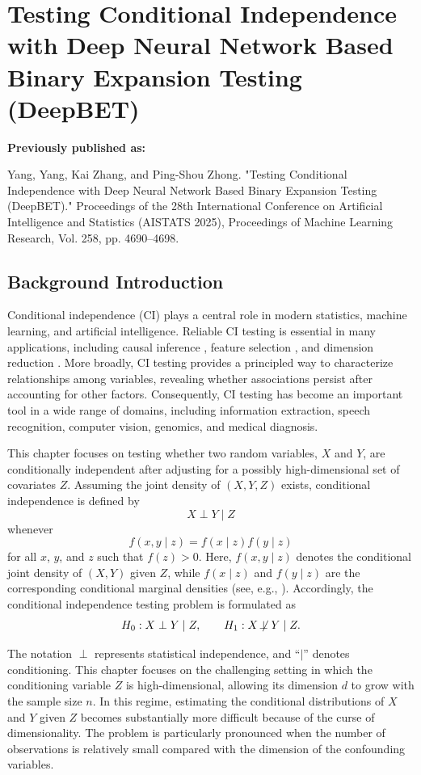 \documentclass[12pt,reqno,oneside]{amsbook}
\theoremstyle{definition}
\theoremstyle{remark}
\begin{document}
\chapter{Testing Conditional Independence with Deep Neural Network Based Binary Expansion Testing (DeepBET)}
\label{DeepBET}
\noindent\textbf{Previously published as:}

Yang, Yang, Kai Zhang, and Ping-Shou Zhong. "Testing Conditional Independence with Deep Neural Network Based Binary Expansion Testing (DeepBET)." Proceedings of the 28th International Conference on Artificial Intelligence and Statistics (AISTATS 2025), Proceedings of Machine Learning Research, Vol. 258, pp. 4690–4698.


\section{Background Introduction}

Conditional independence (CI) plays a central role in modern statistics, machine learning, and artificial intelligence. Reliable CI testing is essential in many applications, including causal inference \cite{Pearl2009CausalII}, feature selection \cite{Cai2018FeatureSM}, and dimension reduction \cite{Waggoner_2021}. More broadly, CI testing provides a principled way to characterize relationships among variables, revealing whether associations persist after accounting for other factors. Consequently, CI testing has become an important tool in a wide range of domains, including information extraction, speech recognition, computer vision, genomics, and medical diagnosis.

\hspace{0.5cm}
This chapter focuses on testing whether two random variables, $X$ and $Y$, are conditionally independent after adjusting for a possibly high-dimensional set of covariates $Z$. Assuming the joint density of $(X,Y,Z)$ exists, conditional independence is defined by
\[
X \perp Y \mid Z
\]
whenever
\[
f(x,y\mid z)=f(x\mid z)f(y\mid z)
\]
for all $x$, $y$, and $z$ such that $f(z)>0$. Here,
$f(x,y\mid z)$ denotes the conditional joint density of $(X,Y)$ given $Z$, while
$f(x\mid z)$ and $f(y\mid z)$ are the corresponding conditional marginal densities (see, e.g., \cite{Shah_2020}). Accordingly, the conditional independence testing problem is formulated as
\[
H_0:X\perp Y\mid Z,
\qquad
H_1:X\not\!\perp Y\mid Z.
\]

The notation $\perp$ represents statistical independence, and ``$|$'' denotes conditioning. This chapter focuses on the challenging setting in which the conditioning variable $Z$ is high-dimensional, allowing its dimension $d$ to grow with the sample size $n$. In this regime, estimating the conditional distributions of $X$ and $Y$ given $Z$ becomes substantially more difficult because of the curse of dimensionality. The problem is particularly pronounced when the number of observations is relatively small compared with the dimension of the confounding variables.
\end{document}
